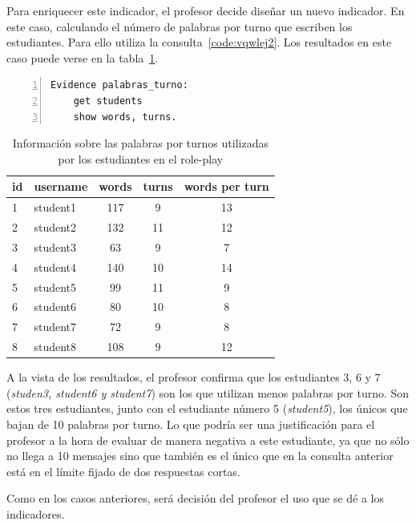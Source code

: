 			Para enriquecer este indicador, el profesor decide diseñar un nuevo indicador. En este caso, calculando el número de palabras por turno que escriben los estudiantes. Para ello utiliza la consulta~\ref{code:vqwlej2}. Los resultados en este caso puede verse en la tabla~\ref{tab:EvsListEj2}.

\begin{lstlisting}[caption=Respuestas de una sola palabra, label=code:vqwlej2,numbers=left, captionpos=b, morekeywords={Evidence,get, students, single, show, words, sentences, turns, time, points}]
Evidence palabras_turno:
    get students
    show words, turns.
\end{lstlisting}

\begin{table}
	\centering
	\caption{Información sobre las palabras por turnos utilizadas por los estudiantes en el role-play}
	\label{tab:EvsListEj2}
	\begin{tabular}{|l|l|c|c|c|}
		\hline
		id & username & words & turns & words per turn \\
		\hline
		\hline
		1 & student1 & 117 & 9 & 13 \\
		\hline
		2 & student2 & 132 & 11 & 12  \\
		\hline
		3 & student3 & 63 & 9 & 7  \\
		\hline
		4 & student4 & 140 & 10 & 14  \\
		\hline
		5 & student5 & 99  & 11 & 9 \\
		\hline
		6 & student6 & 80 & 10 & 8  \\
		\hline
		7 & student7 & 72 & 9 & 8  \\
		\hline
		8 & student8 & 108 & 9 & 12   \\
		\hline
	\end{tabular}
\end{table}

			A la vista de los resultados, el profesor confirma que los estudiantes 3, 6 y 7 (\emph{studen3, student6 y student7}) son los que utilizan menos palabras por turno. Son estos tres estudiantes, junto con el estudiante número 5 (\emph{student5}), los únicos que bajan de 10 palabras por turno. Lo que podría ser una justificación para el profesor a la hora de evaluar de manera negativa a este estudiante, ya que no sólo no llega a 10 mensajes sino que también es el único que en la consulta anterior está en el límite fijado de dos respuestas cortas.

			Como en los casos anteriores, será decisión del profesor el uso que se dé a los indicadores.

